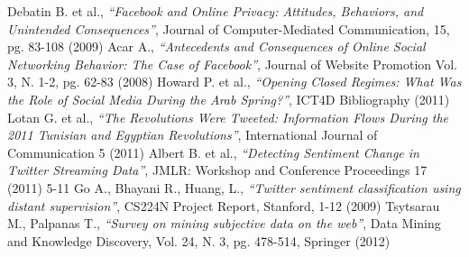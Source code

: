 \documentclass[a4paper]{article}
\begin{document}
\begin{thebibliography}{9}
Debatin B. et al., \emph{``Facebook and Online Privacy: Attitudes, Behaviors,
and Unintended Consequences''}, Journal of Computer-Mediated Communication,
15, pg. 83-108 (2009)
Acar A., \emph{``Antecedents and Consequences of Online Social Networking
Behavior: The Case of Facebook''}, Journal of Website Promotion Vol. 3, N.
1-2, pg. 62-83 (2008)
Howard P. et al., \emph{``Opening Closed Regimes: What Was the Role of Social Media
During the Arab Spring?''}, ICT4D Bibliography (2011)
Lotan G. et al., \emph{``The Revolutions Were Tweeted: Information Flows During
the 2011 Tunisian and Egyptian Revolutions''}, International Journal of
Communication 5 (2011)
Albert B. et al., \emph{``Detecting Sentiment Change in Twitter Streaming
	Data''}, JMLR: Workshop and Conference Proceedings 17 (2011) 5-11
Go A., Bhayani R., Huang, L., \emph{``Twitter sentiment classification using
	distant supervision''}, CS224N Project Report, Stanford, 1-12 (2009)
Tsytsarau M., Palpanas T., \emph{``Survey on mining subjective data on the
	web''}, Data Mining and Knowledge Discovery, Vol. 24, N. 3, pg. 478-514,
	Springer (2012)
\end{thebibliography}
\end{document}
